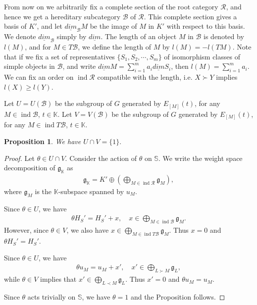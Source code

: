 \documentclass[12pt]{amsart}
\newtheorem{proposition}[theorem]{Proposition}
\begin{document}
From now on we arbitrarily fix a complete section of the root category $\mathcal{R}$, and hence we get a hereditary subcategory $\mathcal{B}$ of $\mathcal{R}$.
This complete section gives a basis of $K'$, and let $\underline{dim}_{\mathcal{B}}M$ be the image of $M$ in $K'$ with respect to this basis.  
We denote $\underline{dim}_{\mathcal{B}}$ simply by $\underline{dim}$.
The length of an object $M$ in $\mathcal{B}$ is denoted by $l(M)$, and for $M\in T\mathcal{B}$, we define the length of $M$ by $l(M) = -l(TM)$.
Note that if we fix a set of representatives $\{ S_1,S_2,\cdots,S_m \}$ of isomorphism classes of simple objects in $\mathcal{B}$, and write 
$\underline{dim}M = \sum\limits_{i=1}^{m} a_i \underline{dim}S_i$, then $l(M)=  \sum\limits_{i=1}^{m} a_i $.
We can fix an order on $\operatorname{ind}\mathcal{R}$ compatible with the length, i.e. $X \succ  Y$ implies $l(X) \geq l(Y)$. 

Let $U = U(\mathcal{B})$ be the subgroup of $G$ generated by $E_{[M]}(t)$, for any $M \in \operatorname{ind}\mathcal{B}$, $ t \in \mathbb{K}$.
Let $V = V(\mathcal{B})$ be the subgroup of $G$ generated by $E_{[M]}(t)$, for any $M \in \operatorname{ind}T\mathcal{B}$, $ t \in \mathbb{K}$.

\begin{proposition}
    We have $U \cap V = \{1\}.$
\end{proposition}

\begin{proof}
    Let $\theta \in U \cap V$. Consider the action of $\theta$ on $\mathbb{S}$.
    We write the weight space decomposition of $\mathfrak{g}_{\mathbb{K}}$ as 
    \begin{align*}
        \mathfrak{g}_{\mathbb{K}}=K' \oplus  (\bigoplus\limits_{M \in \operatorname{ind}\mathcal{R}} \mathfrak{g}_{M} ) ,
    \end{align*}
    where $\mathfrak{g}_M$ is the $\mathbb{K}$-subspace spanned by $u_M$.
    
    Since $\theta \in U$, we have 
    \begin{align*}
        \theta H_S' = H_S' + x ,\quad x\in \bigoplus\limits_{M\in \operatorname{ind}\mathcal{B}} \mathfrak{g}_{M}.
    \end{align*}
    However, since $\theta \in V$, we also have $x\in \bigoplus\limits_{M\in \operatorname{ind}T\mathcal{B}} \mathfrak{g}_{M}$. 
    Thus $x=0$ and $\theta H_S' = H_S'$.

    Since $\theta \in U$, we have 
    \begin{align*}
        \theta u_M = u_M + x', \quad x' \in \bigoplus\limits_{L\succ M} \mathfrak{g}_{L},
    \end{align*}
   while $\theta \in V$ implies that $x' \in \bigoplus\limits_{L \prec M} \mathfrak{g}_{L}$. 
   Thus $x' = 0$ and $\theta u_M =u_M$.

   Since $\theta$ acts trivially on $\mathbb{S}$, we have $\theta = 1$ and the Proposition follows.
\end{proof}
\end{document}
